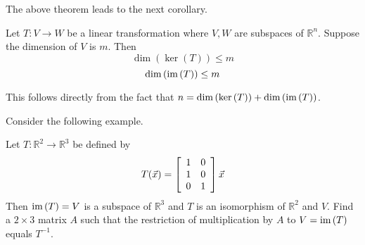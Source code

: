 The above theorem leads to the next corollary.

\begin{corollary}{}{}
Let $T:V\rightarrow W$ be a linear transformation where $V,W$ are subspaces of $\mathbb{R}^n$. Suppose the dimension of $V$ is $m$. Then 
\[
\dim \left( \ker \left( T\right) \right) \leq m
\]
\[
\dim \left( \mbox{im}\left( T \right) \right) \leq m
\]
\end{corollary}

This follows directly from the fact that $n=\dim \left( \ker \left( T\right) \right) +\dim \left( \mbox{im}\left(
T\right) \right) $.

Consider the following example.

\begin{example}{}{}
Let $T:\mathbb{R}^{2}\rightarrow \mathbb{R}^{3}$ be defined by 
\begin{equation*}
T(\vec{x})=\left[
\begin{array}{rr}
1 & 0 \\ 
1 & 0 \\ 
0 & 1
\end{array}
\right] \vec{x}
\end{equation*}
Then $\mbox{im}\left( T\right) =V$ is a subspace of $\mathbb{R}^{3}$ and $T$
is an isomorphism of $\mathbb{R}^{2}$ and $V$. Find a $2\times 3$ matrix $A$
such that the restriction of multiplication by $A$ to $V=\mbox{im}\left(
T\right) $ equals $T^{-1}$. 
\end{example}

